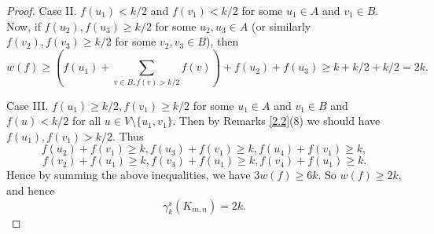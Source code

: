 \documentclass[12pt]{amsart}
\begin{document}
\begin{proof}
Case II.  $f(u_1)<k/2$ and $f(v_1)< k/2$ for some $u_1\in A$ and $v_1\in B$. Now, if $f(u_2), f(u_3)\geq k/2$ for some $u_2, u_3\in A$ (or similarly $f(v_2), f(v_3)\geq k/2$ for some $v_2, v_3\in B$), then 
$$w(f)\geq (f(u_1)+\sum_{v\in B,f(v)>k/2}f(v))+f(u_2)+f(u_3)\geq k+k/2+k/2=2k.$$

Case III. $f(u_1)\geq k/2, f(v_1)\geq k/2$ for some $u_1\in A$ and $v_1\in B$ and $f(u)<k/2$ for all $u\in V\setminus\{u_1, v_1\}$. Then by Remarks \ref{2.2}(8) we should have $f(u_1), f(v_1)>k/2$. Thus
$$f(u_2)+f(v_1)\geq k, f(u_3)+f(v_1)\geq k,f(u_4)+f(v_1)\geq k,$$
$$f(v_2)+f(u_1)\geq k, f(v_3)+f(u_1)\geq k, f(v_4)+f(u_1)\geq k.$$
Hence by summing the above inequalities, we have $3w(f)\geq 6k$. So
$w(f)\geq 2k$, and hence 
$$\gamma_k^s(K_{m,n})=2k.$$

\end{proof}
\end{document}
